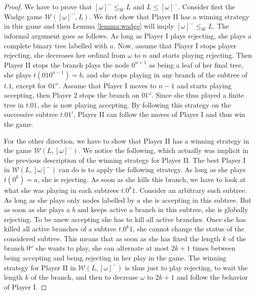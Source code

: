 \begin{proof} We have to prove that $[\omega]^-\leq_W L$ and $L\leq [\omega]^-$. Consider first the Wadge game $\mathcal{W}([\omega]^-, L)$. We first show that 
Player II has a winning strategy in this game and then Lemma \ref{lemma:wadge} will imply $[\omega]^-\leq_W L$. The informal argument goes as follows. As long as Player I plays rejecting, she plays a complete binary tree labelled with $a$. Now, assume that Player I stops player rejecting, she decreases her ordinal from $\omega$ to $n$ and starts playing rejecting. Then Player II stops the branch plays the node $0^{n+1}$ as being a leaf of her final tree, she plays $t(010^{n-1})=b$, and she stops playing in any branch of the subtree of $t.1$, except for $01^\omega$. Assume that Player I moves to $n-1$ and starts playing accepting, then Player 2 stops the branch on $01^\omega$. Since she thus played a finite tree in $t.01$, she is now playing accepting. By following this strategy on the successive subtree $t.01^i$, Player II can follow the moves of Player I and thus win the game.

For the other direction, we have to show that Player II has a winning strategy in the game $\mathcal{W}(L,[\omega]^-)$. We notice the following, which actually was implicit in the previous description of the winning strategy for Player II. The best Player I in $\mathcal{W}(L,[\omega]^-)$ can do is to apply the following strategy. As long as she plays $t(0^k) = a$, she is rejecting. As soon as she kills this branch, we have to look at what she was playing in each subtrees  $t.0^k1$. Consider an arbitrary such subtree. As long as she plays only nodes labelled by $a$ she is accepting in this subtree. But as soon as she plays a $b$ and keeps active a branch in this subtree, she is globally rejecting. To be anew accepting she has to kill all active branches. Once she has killed all active branches of a subtree $t.0^k1$, she cannot change the status of the considered subtree. This means that as soon as she has fixed the length $k$ of the branch $0^\omega$ she wants to play, she can  alternate at most $2k+1$ times between being accepting and being rejecting in her play in the game. The winning strategy for Player II in $\mathcal{W}(L, [\omega]^-)$ is thus just to play rejecting, to wait the length $k$ of the branch, and then to decrease $\omega$ to $2k+1$ and follow the behavior of Player I.
\end{proof}


\vspace{0.2cm}
\hspace{0.1cm}

